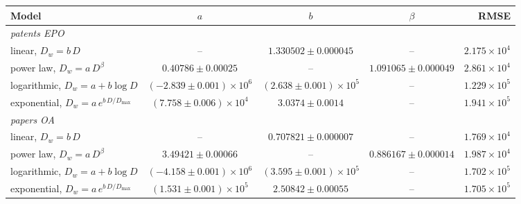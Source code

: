 \begin{tabular}{lcccr}
\toprule
Model & $a$ & $b$ & $\beta$ & RMSE \\
\midrule
\multicolumn{5}{l}{\textit{patents EPO}} \\
linear, $D_w=b\,D$ & -- & $1.330502 \pm 0.000045$ & -- & $2.175\times 10^{4}$ \\
power law, $D_w=a\,D^{\beta}$ & $0.40786 \pm 0.00025$ & -- & $1.091065 \pm 0.000049$ & $2.861\times 10^{4}$ \\
logarithmic, $D_w=a+b\log D$ & $(-2.839 \pm 0.001)\times 10^{6}$ & $(2.638 \pm 0.001)\times 10^{5}$ & -- & $1.229\times 10^{5}$ \\
exponential, $D_w=a\,e^{b\,D/D_{\max}}$ & $(7.758 \pm 0.006)\times 10^{4}$ & $3.0374 \pm 0.0014$ & -- & $1.941\times 10^{5}$ \\
\midrule
\multicolumn{5}{l}{\textit{papers OA}} \\
linear, $D_w=b\,D$ & -- & $0.707821 \pm 0.000007$ & -- & $1.769\times 10^{4}$ \\
power law, $D_w=a\,D^{\beta}$ & $3.49421 \pm 0.00066$ & -- & $0.886167 \pm 0.000014$ & $1.987\times 10^{4}$ \\
logarithmic, $D_w=a+b\log D$ & $(-4.158 \pm 0.001)\times 10^{6}$ & $(3.595 \pm 0.001)\times 10^{5}$ & -- & $1.702\times 10^{5}$ \\
exponential, $D_w=a\,e^{b\,D/D_{\max}}$ & $(1.531 \pm 0.001)\times 10^{5}$ & $2.50842 \pm 0.00055$ & -- & $1.705\times 10^{5}$ \\
\bottomrule
\end{tabular}
